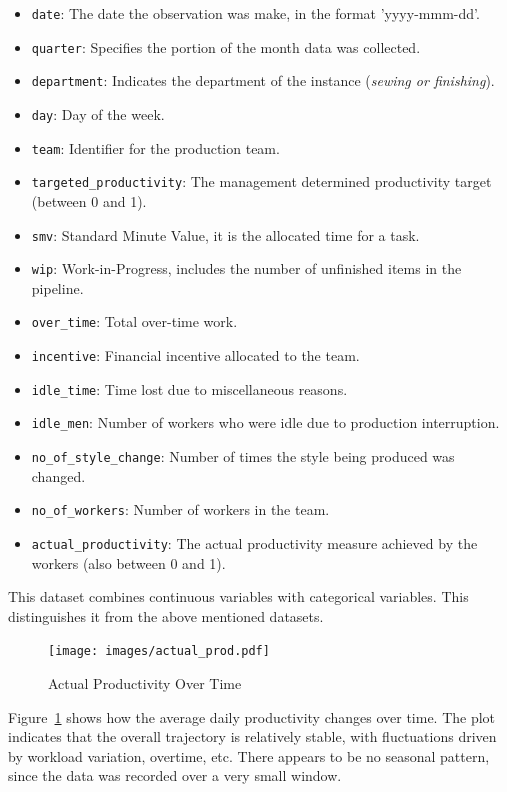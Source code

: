 \documentclass[conference]{IEEEtran}
\begin{document}
\begin{itemize}
    \item \texttt{date}: The date the observation was make, in the format 'yyyy-mmm-dd'.
    \item \texttt{quarter}: Specifies the portion of the month data was collected.
    \item \texttt{department}: Indicates the department of the instance (\textit{sewing or finishing}).
    \item \texttt{day}: Day of the week.
    \item \texttt{team}: Identifier for the production team.
    \item \texttt{targeted\_productivity}: The management determined productivity target (between 0 and 1).
    \item \texttt{smv}: Standard Minute Value, it is the allocated time for a task.
    \item \texttt{wip}: Work-in-Progress, includes the number of unfinished items in the pipeline.
    \item \texttt{over\_time}: Total over-time work.
    \item \texttt{incentive}: Financial incentive allocated to the team.
    \item \texttt{idle\_time}: Time lost due to miscellaneous reasons.
    \item \texttt{idle\_men}: Number of workers who were idle due to production interruption.
    \item \texttt{no\_of\_style\_change}: Number of times the style being produced was changed.
    \item \texttt{no\_of\_workers}: Number of workers in the team.
    \item \texttt{actual\_productivity}: The actual productivity measure achieved by the workers (also between 0 and 1).
\end{itemize}

This dataset combines continuous variables with categorical variables. This distinguishes it from the above mentioned datasets.

\begin{figure}[H]
\centering
\texttt{[image: images/actual\_prod.pdf]}
\caption{Actual Productivity Over Time}
\label{fig:actual_prod}
\end{figure}

Figure~\ref{fig:actual_prod} shows how the average daily productivity changes over time. The plot indicates that the overall trajectory is relatively stable, with fluctuations driven by workload variation, overtime, etc. There appears to be no seasonal pattern, since the data was recorded over a very small window.
\end{document}
